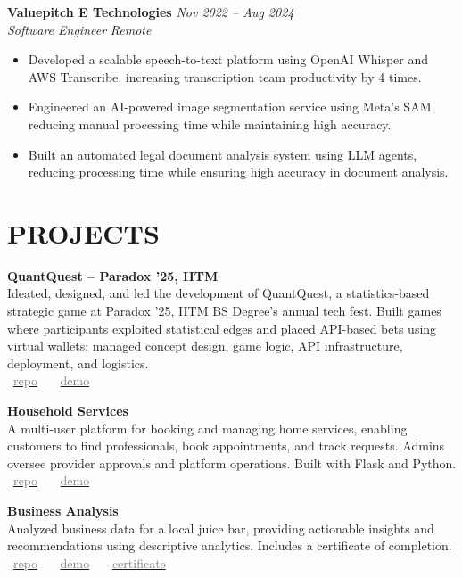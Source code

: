 \documentclass[11pt,a4paper]{article}
\begin{document}
\textbf{Valuepitch E Technologies} \hfill \textit{Nov 2022 -- Aug 2024} \\
\textit{Software Engineer} \hfill \textit{Remote} \begin{itemize}[leftmargin=*]
    \item Developed a scalable speech-to-text platform using OpenAI Whisper and AWS Transcribe, increasing transcription team productivity by 4 times.
    \item Engineered an AI-powered image segmentation service using Meta's SAM, reducing manual processing time while maintaining high accuracy.
    \item Built an automated legal document analysis system using LLM agents, reducing processing time while ensuring high accuracy in document analysis.
\end{itemize}

\section*{PROJECTS}

\textbf{QuantQuest – Paradox ’25, IITM} \\
Ideated, designed, and led the development of QuantQuest, a statistics-based strategic game at Paradox ’25, IITM BS Degree's annual tech fest. Built games where participants exploited statistical edges and placed API-based bets using virtual wallets; managed concept design, game logic, API infrastructure, deployment, and logistics. \\
\faGithub~\href{https://github.com/21f1006194/quant-quest}{\textcolor{gray}{repo}} \, \textbar{} \,
\faPlayCircle~\href{https://youtu.be/zgA83sge67Y?t=1211}{\textcolor{gray}{demo}} 

\textbf{Household Services} \\
A multi-user platform for booking and managing home services, enabling customers to find professionals, book appointments, and track requests. Admins oversee provider approvals and platform operations. Built with Flask and Python. \\
\faGithub~\href{https://github.com/21f1006194/Household-Services}{\textcolor{gray}{repo}} \, \textbar{} \,
\faPlayCircle~\href{https://www.youtube.com/watch?v=FHMdtaLWznI}{\textcolor{gray}{demo}} 

\pagebreak

\textbf{Business Analysis} \\
Analyzed business data for a local juice bar, providing actionable insights and recommendations using descriptive analytics. Includes a certificate of completion. \\
\faGithub~\href{https://github.com/jishnujp/avocado-analysis}{\textcolor{gray}{repo}} \, \textbar{} \,
\faPlayCircle~\href{https://www.youtube.com/watch?v=u5RuEhBsXKg}{\textcolor{gray}{demo}} \, \textbar{} \,
\faFilePdfO~\href{https://raw.githubusercontent.com/jishnujp/avocado-analysis/main/public/certificate.pdf}{\textcolor{gray}{certificate}} 
\end{document}
